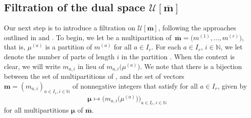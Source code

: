 \documentclass[pdftex]{sigma}
\numberwithin{equation}{section}
\begin{document}
\subsection[Filtration of the dual space Um]{Filtration of the dual space $\boldsymbol{\mathcal{U}[\overline{\mathbf{m}}]}$}\label{Section 3.3}

Our next step is to introduce a filtration on $\mathcal{U}[\overline{\mathbf{m}}]$, following the approaches outlined in \cite[Section 3.4]{AKS06} and \cite[Section 4.1]{AK07}. To begin, we let  be a multipartition of~${\overline{\mathbf{m}}=\bigl(m^{(1)},\dots, m^{(r)}\bigr)}$, that is, $\mu^{(a)}$ is a partition of $m^{(a)}$ for all $a\in I_r$. For each $a\in I_r$, $i\in\mathbb{N}$, we let  denote the number of parts of length $i$ in the partition . When the context is clear, we will write $m_{a,i}$ in lieu of $m_{a,i}\bigl(\mu^{(a)}\bigr)$. We note that there is a bijection between the set of multipartitions  of , and the set of vectors~${\mathbf{m}=(m_{a,i})_{a\in I_r,i\in\mathbb{N}}}$ of nonnegative integers that satisfy  for all $a\in I_r$, given by
\begin{equation}\label{eq:3.21}
\bm{\mu}\mapsto\bigl(m_{a,i}\bigl(\mu^{(a)}\bigr)\bigr)_{a\in I_r,i\in\mathbb{N}}
\end{equation}
for all multipartitions $\bm{\mu}$ of $\overline{\mathbf{m}}$.
\end{document}
